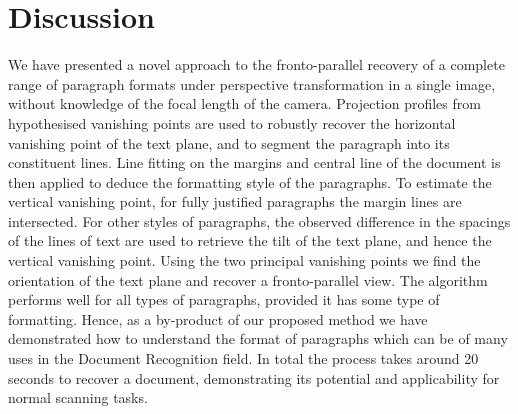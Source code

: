 \documentclass{elsart}   %
\begin{document}






\section{Discussion} \label{conclusions}

We have presented a novel approach to the fronto-parallel recovery of a complete
range of  paragraph formats under perspective transformation in a
single image, without knowledge of the focal length of the camera.  Projection
profiles from hypothesised vanishing points are used to robustly recover the
horizontal vanishing point of the text plane, and to segment the paragraph into
its constituent lines.  Line fitting on the margins and central line of the
document is then applied to deduce the formatting style of the paragraphs.  To
estimate the vertical vanishing point, for fully justified paragraphs the margin
lines are intersected.  For other styles of paragraphs, the observed difference
in the spacings of the lines of text are used to retrieve the tilt of the text
plane, and hence the vertical vanishing point.  Using the two principal
vanishing points we find the orientation of the text plane and recover a
fronto-parallel view.  The algorithm performs well for all types of paragraphs,
provided it has some type of formatting. Hence, as a by-product of our proposed
method we have demonstrated how to understand the format of paragraphs which can 
be of many uses in the Document Recognition field.
In total the process takes around 20 seconds to recover a document,
demonstrating its potential and applicability 
for normal scanning tasks.

\end{document}
